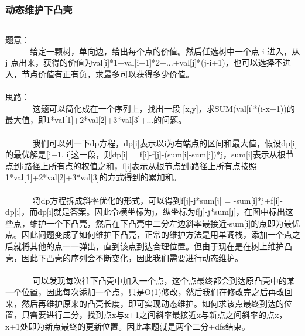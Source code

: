 \documentclass[twoside]{article}
\begin{document}
\subsubsection{动态维护下凸壳}
\begin{lstlisting}
\end{lstlisting}
题意：\\
       给定一颗树，单向边，给出每个点的价值。然后任选树中一个点 i 进入，从 j 点出来，获得的价值为val[i]*1+val[i+1]*2+...+val[j]*(j-i+1)，也可以选择不进入，节点价值有正有负，求最多可以获得多少价值。\\
\\
思路：\\
        这题可以简化成在一个序列上，找出一段 [x,y]，求SUM(val[i]*(i-x+1))的最大值，即1*val[1]+2*val[2]+3*val[3]+...的问题。\\
\\
        我们可以列一下dp方程，dp[i]表示以i为右端点的区间和最大值，假设dp[i]的最优解是[j+1, i]这一段，则dp[i] = f[i]-f[j]-(sum[i]-sum[j])*j，sum[i]表示从根节点到i路径上所有点的权值之和，f[i]表示从根节点到i路径上所有点按照1*val[1]+2*val[2]+3*val[3]的方式得到的累加和。\\
\\
        将dp方程拆成斜率优化的形式，可以得到f[j]-j*sum[j] = -sum[i]*j+f[i]-dp[i]，而dp[i]就是答案。因此令横坐标为j，纵坐标为f[j]-j*sum[j]，在图中标出这些点，维护一个下凸壳，然后在下凸壳中二分左边斜率最接近-sum[i]的点即为最优点。因此问题变成了如何维护下凸壳，正常的维护方法是用单调栈，添加一个点之后就将其他的点一一弹出，直到该点到达合理位置。但由于现在是在树上维护凸壳，因此下凸壳的序列会不断变化，因此我们需要进行动态维护。\\
\\
        可以发现每次往下凸壳中加入一个点，这个点最终都会到达原凸壳中的某一个位置，因此每次添加一个点，只是O(1)修改，然后我们在修改完之后再改回来，然后再维护原来的凸壳长度，即可实现动态维护。如何求该点最终到达的位置，只需要进行二分，找到点x与x+1之间斜率最接近x与新点之间斜率的点x，x+1处即为新点最终的更新位置。因此本题就是两个二分+dfs结束。\\
\end{document}
